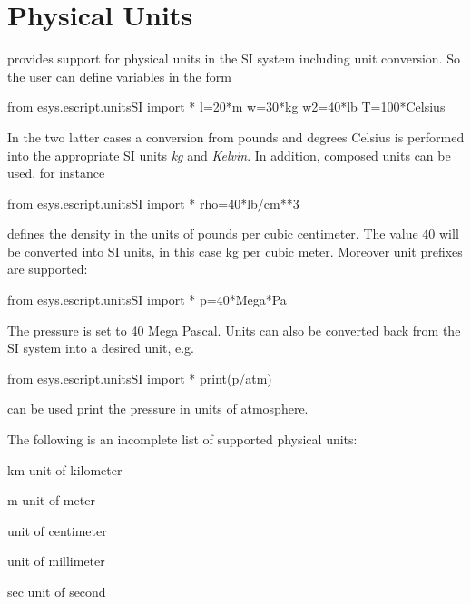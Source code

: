 \section{Physical Units}
\escript provides support for physical units in the SI system
including unit conversion. So the user can define variables in the form
\begin{python}
  from esys.escript.unitsSI import *
  l=20*m
  w=30*kg
  w2=40*lb
  T=100*Celsius
\end{python}
In the two latter cases a conversion from pounds and degrees
Celsius is performed into the appropriate SI units \emph{kg}
and \emph{Kelvin}.
In addition, composed units can be used, for instance
\begin{python}
  from esys.escript.unitsSI import *
  rho=40*lb/cm**3
\end{python}
defines the density in the units of pounds per cubic centimeter.
The value $40$ will be converted into SI units, in this case kg per cubic
meter. Moreover unit prefixes are supported:
\begin{python}
  from esys.escript.unitsSI import *
  p=40*Mega*Pa
\end{python}
The pressure  is set to 40 Mega Pascal. Units can also be converted
back from the SI system into a desired unit, e.g.
\begin{python}
  from esys.escript.unitsSI import *
  print(p/atm)
\end{python}
can be used print the pressure in units of atmosphere.

The following is an incomplete list of supported physical units:

\begin{datadesc}{km}
unit of kilometer
\end{datadesc}

\begin{datadesc}{m}
unit of meter
\end{datadesc}

\begin{datadesc}{cm}
unit of centimeter
\end{datadesc}

\begin{datadesc}{mm}
unit of millimeter
\end{datadesc}

\begin{datadesc}{sec}
unit of second
\end{datadesc}

